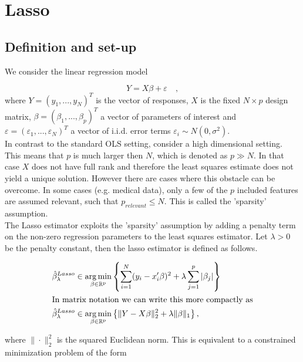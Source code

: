\documentclass{article}
\theoremstyle{definition}
\DeclareMathOperator*{\argmin}{arg\,min}
\begin{document}


\newpage

\section{Lasso}
\subsection{Definition and set-up}
We consider the linear regression model

\begin{equation}
	Y=X\beta+\varepsilon\quad,
\end{equation}
%
where $Y=(y_{1},...,y_{N})^T$ is the vector of responses, $X$ is the fixed $N \times p$ design matrix, $\beta=(\beta_1,...,\beta_p)^T$ a vector of parameters of interest and $\varepsilon=(\varepsilon_1,...,\varepsilon_N)^T$ a vector of i.i.d. error terms $\varepsilon_i \sim N(0,\sigma^2)$.\\
In contrast to the standard OLS setting, consider a high dimensional setting. This means that $p$ is much larger then $N$, which is denoted as $p\gg N$. In that case $X$ does not have full rank and therefore the least squares estimate does not yield a unique solution. However there are cases where this obstacle can be overcome. In some cases (e.g. medical data), only a few of the $p$ included features are assumed relevant, such that $p_{relevant}\leq N$. This is called the 'sparsity' assumption.\\
The Lasso estimator exploits the 'sparsity' assumption by adding a penalty term on the non-zero regression parameters to the least squares estimator. Let $\lambda>0$ be the penalty constant, then the lasso estimator is defined as follows.

\begin{align}
\hat{\beta}_{\lambda}^{Lasso}&\in\argmin_{\beta \in\rm \mathbb{R}^p} \left \{   \sum_{i=1}^{N}(y_{i}-x_{i}'\beta)^2+\lambda \sum_{j=1}^p|\beta_j| \right\}\\
\shortintertext{In matrix notation we can write this more compactly as}
\hat{\beta}_{\lambda}^{Lasso}&\in\argmin_{\beta \in\rm \mathbb{R}^p}  \left\{ \| Y-X\beta\|_2^2+\lambda \| \beta\|_1 \right\}, \label{LassoLambda}
\end{align} 

\noindent where $ \| \cdot \|_2^2 $ is the squared Euclidean norm. This is equivalent to a constrained minimization problem of the form 
\end{document}
